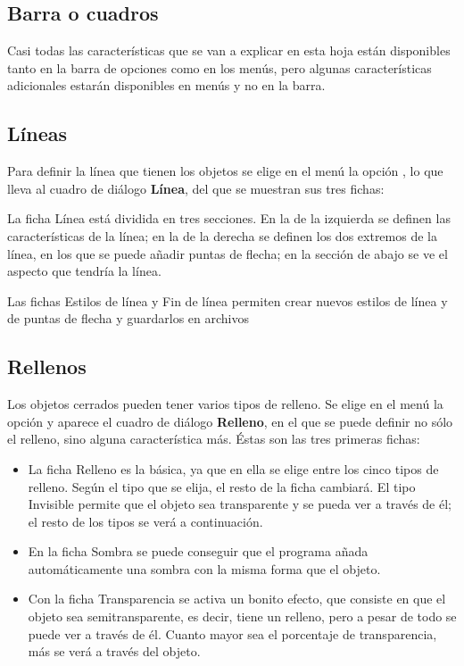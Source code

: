 \subsection{Barra o cuadros}

Casi todas las características que se van a explicar en esta hoja
están disponibles tanto en la barra de opciones como en los menús,
pero algunas características adicionales estarán disponibles en menús
y no en la barra.

\subsection{Líneas}

Para definir la línea que tienen los objetos se elige en el menú
 la opción , lo que lleva al cuadro de
diálogo \textbf{Línea}, del que se muestran sus tres fichas:

La ficha Línea está dividida en tres secciones. En la de la izquierda
se definen las características de la línea; en la de la derecha se
definen los dos extremos de la línea, en los que se puede añadir
puntas de flecha; en la sección de abajo se ve el aspecto que tendría
la línea.

Las fichas Estilos de línea y Fin de línea permiten crear nuevos
estilos de línea y de puntas de flecha y guardarlos en archivos

\subsection{Rellenos}

Los objetos cerrados pueden tener varios tipos de relleno. Se elige en
el menú  la opción  y aparece el cuadro de
diálogo \textbf{Relleno}, en el que se puede definir no sólo el
relleno, sino alguna característica más. Éstas son las tres primeras
fichas:

\begin{itemize}
\item La ficha Relleno es la básica, ya que en ella se elige entre 
los cinco tipos de relleno. Según el tipo que se elija, el resto 
de la ficha cambiará. El tipo Invisible permite que el objeto sea 
transparente y se pueda ver a través de él; el resto de los tipos 
se verá a continuación.

\item En la ficha Sombra se puede conseguir que el programa añada 
automáticamente una sombra con la misma forma que el objeto.

\item Con la ficha Transparencia se activa un bonito efecto, que 
consiste en que el objeto sea semitransparente, es decir, tiene un 
relleno, pero a pesar de todo se puede ver a través de él. Cuanto 
mayor sea el porcentaje de transparencia, más se verá a través del 
objeto.
\end{itemize}

